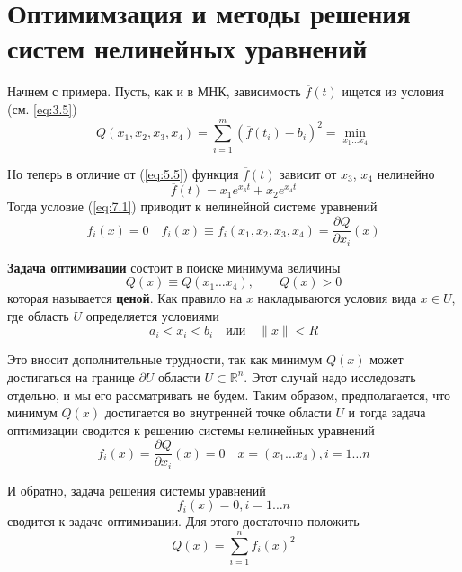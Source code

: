\section{Оптимимзация и методы решения систем нелинейных уравнений}

Начнем с примера. Пусть, как и в МНК, зависимость $\overline{f}(t)$ ищется из условия (см. \ref{eq:3.5})
\begin{equation} \label{eq:7.1}
	Q(x_1, x_2, x_3, x_4) = \sum^m_{i=1}{(\overline{f}(t_i)-b_i)^2} = \min_{x_1 \dots x_4}
\end{equation}

Но теперь в отличие от (\ref{eq:5.5}) функция $\overline{f}(t)$ зависит от $x_3$, $x_4$ нелинейно
\begin{equation} \label{eq:7.2}
	\overline{f}(t) = x_1e^{x_3 t} + x_2e^{x_4 t}
\end{equation}
Тогда условие (\ref{eq:7.1}) приводит к нелинейной системе уравнений
\begin{equation} \label{eq:7.3}
	f_i(x) = 0 \quad
	f_i(x) \equiv f_i(x_1, x_2, x_3, x_4) = \frac{\partial Q}{\partial x_i}(x)
\end{equation}

\textbf{Задача оптимизации} состоит в поиске минимума величины 
\begin{equation} \label{eq:7.4}
	Q(x) \equiv Q(x_1 \dots x_4), \qquad
	Q(x) > 0
\end{equation}
которая называется \textbf{ценой}. Как правило на $x$ накладываются условия вида $x \in U$, где область $U$ определяется условиями
\begin{equation} \label{eq:7.5}
	a_i < x_i < b_i \quad \textrm{или} \quad \|x\| < R
\end{equation}

Это вносит дополнительные трудности, так как минимум $Q(x)$ может достигаться на границе $\partial U$  области $U \subset \mathbb{R}^n$. Этот случай надо исследовать отдельно, и мы его рассматривать не будем. Таким образом, предполагается, что минимум $Q(x)$ достигается во внутренней точке области $U$ и тогда задача оптимизации сводится к решению системы нелинейных уравнений
\begin{equation} \label{eq:7.6}
	f_i(x) = \frac{\partial Q}{\partial x_i}(x) = 0 \quad x = (x_1 \dots x_4), i = 1 \dots n
\end{equation}

И обратно, задача решения системы уравнений
\begin{equation} \label{eq:7.7}
	f_i(x) = 0, i = 1 \dots n
\end{equation}
сводится к задаче оптимизации. Для этого достаточно положить
\begin{equation} \label{eq:7.8}
	Q(x) = \sum^n_{i=1}{f_i(x)^2}
\end{equation}

